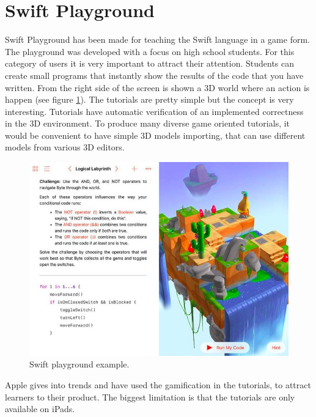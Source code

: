 \section{Swift Playground} \label{sec:swift}
Swift Playground \cite{Swift, kaczmarek2018becoming} has been made for teaching the Swift language in a game form. The playground was developed with a focus on high school students. For this category of users it is very important to attract their attention. Students can create small programs that instantly show the results of the code that you have written. From the right side of the screen is shown a 3D world where an action is happen (see figure \ref{fig:swift}). The tutorials are pretty simple but the concept is very interesting. Tutorials have automatic verification of an implemented correctness in the 3D environment. To produce many diverse game oriented tutorials, it would be convenient to have simple 3D models importing, that can use different models from various 3D editors.
\begin{figure}[h!]
    \centering
    \includegraphics[width=0.6\linewidth]{src/pic/swift}
    \caption{Swift playground example.}
    \label{fig:swift}
\end{figure}
Apple gives into trends and have used the gamification in the tutorials, to attract learners to their product. The biggest limitation is that the tutorials are only available on iPads.

